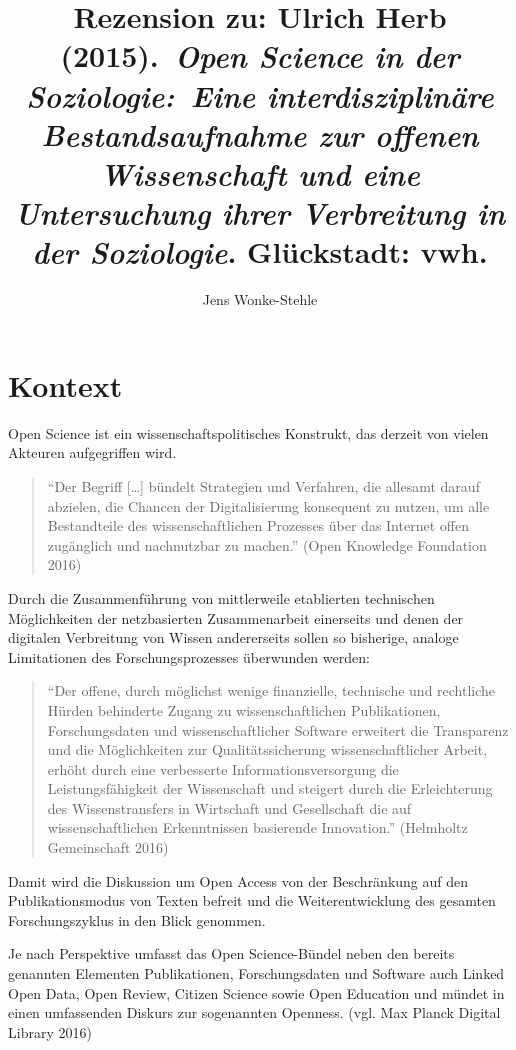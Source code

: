 \documentclass[a4paper,
fontsize=11pt,
oneside,
numbers=noperiodatend,
parskip=half-,
bibliography=totoc,
final
]{scrartcl}
\title{\LARGE{Rezension zu: Ulrich Herb (2015). \emph{Open Science in der Soziologie: Eine interdisziplinäre Bestandsaufnahme zur offenen Wissenschaft und eine Untersuchung ihrer Verbreitung in der Soziologie}. Glückstadt: vwh.
}} %
\author{Jens Wonke-Stehle} %
\date{}
\begin{document}
\maketitle
\thispagestyle{fancyplain} 


\section*{Kontext}\label{kontext}

Open Science ist ein wissenschaftspolitisches Konstrukt, das derzeit von
vielen Akteuren aufgegriffen wird.

\begin{quote}
\enquote{Der Begriff {[}\ldots{}{]} bündelt Strategien und Verfahren,
die allesamt darauf abzielen, die Chancen der Digitalisierung konsequent
zu nutzen, um alle Bestandteile des wissenschaftlichen Prozesses über
das Internet offen zugänglich und nachnutzbar zu machen.} (Open
Knowledge Foundation 2016)
\end{quote}

Durch die Zusammenführung von mittlerweile etablierten technischen
Möglichkeiten der netzbasierten Zusammenarbeit einerseits und denen der
digitalen Verbreitung von Wissen andererseits sollen so bisherige,
analoge Limitationen des Forschungsprozesses überwunden werden:

\begin{quote}
\enquote{Der offene, durch möglichst wenige finanzielle, technische und
rechtliche Hürden behinderte Zugang zu wissenschaftlichen Publikationen,
Forschungsdaten und wissenschaftlicher Software erweitert die
Transparenz und die Möglichkeiten zur Qualitätssicherung
wissenschaftlicher Arbeit, erhöht durch eine verbesserte
Informationsversorgung die Leistungsfähigkeit der Wissenschaft und
steigert durch die Erleichterung des Wissenstransfers in Wirtschaft und
Gesellschaft die auf wissenschaftlichen Erkenntnissen basierende
Innovation.} (Helmholtz Gemeinschaft 2016)
\end{quote}

Damit wird die Diskussion um Open Access von der Beschränkung auf den
Publikationsmodus von Texten befreit und die Weiterentwicklung des
gesamten Forschungszyklus in den Blick genommen.

Je nach Perspektive umfasst das Open Science-Bündel neben den bereits
genannten Elementen Publikationen, Forschungsdaten und Software auch
Linked Open Data, Open Review, Citizen Science sowie Open Education und
mündet in einen umfassenden Diskurs zur sogenannten Openness. (vgl. Max
Planck Digital Library 2016)
\end{document}
